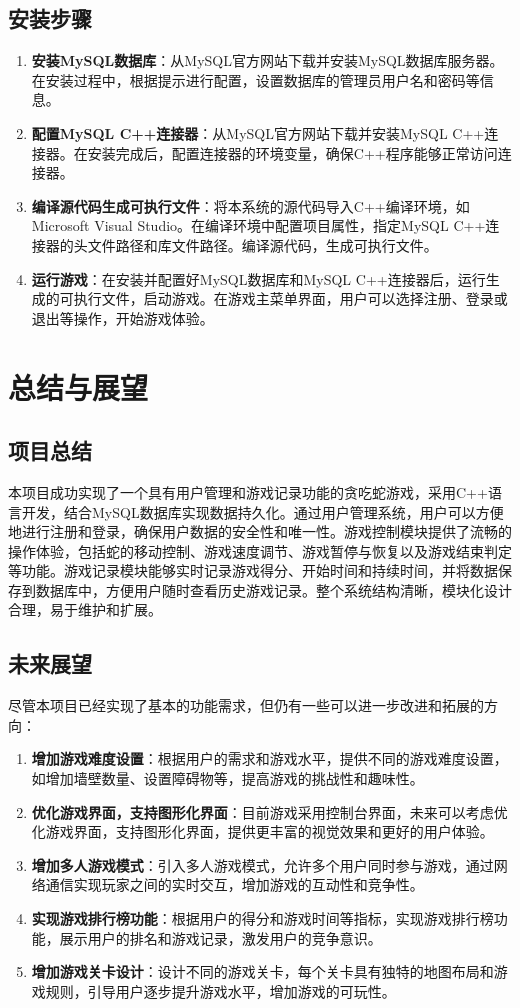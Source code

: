 \documentclass{article}
\begin{document}
\subsection{安装步骤}
\begin{enumerate}
    \item \textbf{安装MySQL数据库}：从MySQL官方网站下载并安装MySQL数据库服务器。在安装过程中，根据提示进行配置，设置数据库的管理员用户名和密码等信息。
    \item \textbf{配置MySQL C++连接器}：从MySQL官方网站下载并安装MySQL C++连接器。在安装完成后，配置连接器的环境变量，确保C++程序能够正常访问连接器。
    \item \textbf{编译源代码生成可执行文件}：将本系统的源代码导入C++编译环境，如Microsoft Visual Studio。在编译环境中配置项目属性，指定MySQL C++连接器的头文件路径和库文件路径。编译源代码，生成可执行文件。
    \item \textbf{运行游戏}：在安装并配置好MySQL数据库和MySQL C++连接器后，运行生成的可执行文件，启动游戏。在游戏主菜单界面，用户可以选择注册、登录或退出等操作，开始游戏体验。
\end{enumerate}

\section{总结与展望}

\subsection{项目总结}
本项目成功实现了一个具有用户管理和游戏记录功能的贪吃蛇游戏，采用C++语言开发，结合MySQL数据库实现数据持久化。通过用户管理系统，用户可以方便地进行注册和登录，确保用户数据的安全性和唯一性。游戏控制模块提供了流畅的操作体验，包括蛇的移动控制、游戏速度调节、游戏暂停与恢复以及游戏结束判定等功能。游戏记录模块能够实时记录游戏得分、开始时间和持续时间，并将数据保存到数据库中，方便用户随时查看历史游戏记录。整个系统结构清晰，模块化设计合理，易于维护和扩展。

\subsection{未来展望}
尽管本项目已经实现了基本的功能需求，但仍有一些可以进一步改进和拓展的方向：
\begin{enumerate}
    \item \textbf{增加游戏难度设置}：根据用户的需求和游戏水平，提供不同的游戏难度设置，如增加墙壁数量、设置障碍物等，提高游戏的挑战性和趣味性。
    \item \textbf{优化游戏界面，支持图形化界面}：目前游戏采用控制台界面，未来可以考虑优化游戏界面，支持图形化界面，提供更丰富的视觉效果和更好的用户体验。
    \item \textbf{增加多人游戏模式}：引入多人游戏模式，允许多个用户同时参与游戏，通过网络通信实现玩家之间的实时交互，增加游戏的互动性和竞争性。
    \item \textbf{实现游戏排行榜功能}：根据用户的得分和游戏时间等指标，实现游戏排行榜功能，展示用户的排名和游戏记录，激发用户的竞争意识。
    \item \textbf{增加游戏关卡设计}：设计不同的游戏关卡，每个关卡具有独特的地图布局和游戏规则，引导用户逐步提升游戏水平，增加游戏的可玩性。
\end{enumerate}
\end{document}
